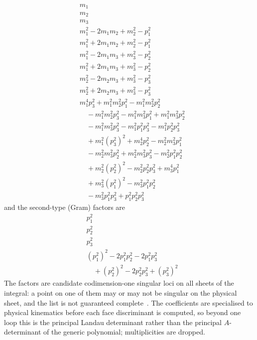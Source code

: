 \documentclass[11pt,a4paper]{article}
\begin{document}
\begin{align*}
&m_{1} \\
&m_{2} \\
&m_{3} \\
&m_{1}^{2} - 2 m_{1} m_{2} + m_{2}^{2} - p^{2}_{1} \\
&m_{1}^{2} + 2 m_{1} m_{2} + m_{2}^{2} - p^{2}_{1} \\
&m_{1}^{2} - 2 m_{1} m_{3} + m_{3}^{2} - p^{2}_{2} \\
&m_{1}^{2} + 2 m_{1} m_{3} + m_{3}^{2} - p^{2}_{2} \\
&m_{2}^{2} - 2 m_{2} m_{3} + m_{3}^{2} - p^{2}_{3} \\
&m_{2}^{2} + 2 m_{2} m_{3} + m_{3}^{2} - p^{2}_{3} \\
&m_{1}^{4} p^{2}_{3} + m_{1}^{2} m_{2}^{2} p^{2}_{1} - m_{1}^{2} m_{2}^{2} p^{2}_{2} \\
&\quad {}- m_{1}^{2} m_{2}^{2} p^{2}_{3} - m_{1}^{2} m_{3}^{2} p^{2}_{1} + m_{1}^{2} m_{3}^{2} p^{2}_{2} \\
&\quad {}- m_{1}^{2} m_{3}^{2} p^{2}_{3} - m_{1}^{2} p^{2}_{1} p^{2}_{3} - m_{1}^{2} p^{2}_{2} p^{2}_{3} \\
&\quad {}+ m_{1}^{2} \left(p^{2}_{3}\right)^{2} + m_{2}^{4} p^{2}_{2} - m_{2}^{2} m_{3}^{2} p^{2}_{1} \\
&\quad {}- m_{2}^{2} m_{3}^{2} p^{2}_{2} + m_{2}^{2} m_{3}^{2} p^{2}_{3} - m_{2}^{2} p^{2}_{1} p^{2}_{2} \\
&\quad {}+ m_{2}^{2} \left(p^{2}_{2}\right)^{2} - m_{2}^{2} p^{2}_{2} p^{2}_{3} + m_{3}^{4} p^{2}_{1} \\
&\quad {}+ m_{3}^{2} \left(p^{2}_{1}\right)^{2} - m_{3}^{2} p^{2}_{1} p^{2}_{2} \\
&\quad {}- m_{3}^{2} p^{2}_{1} p^{2}_{3} + p^{2}_{1} p^{2}_{2} p^{2}_{3}
\end{align*}
and the second-type (Gram) factors are
\begin{align*}
&p^{2}_{1} \\
&p^{2}_{2} \\
&p^{2}_{3} \\
&\left(p^{2}_{1}\right)^{2} - 2 p^{2}_{1} p^{2}_{2} - 2 p^{2}_{1} p^{2}_{3} \\
&\quad {}+ \left(p^{2}_{2}\right)^{2} - 2 p^{2}_{2} p^{2}_{3} + \left(p^{2}_{3}\right)^{2}
\end{align*}
The factors are candidate codimension-one singular loci on all sheets of the integral: a point on one of them may or may not be singular on the physical sheet, and the list is not guaranteed complete~\cite{fmt2023}. The coefficients are specialised to physical kinematics before each face discriminant is computed, so beyond one loop this is the principal Landau determinant rather than the principal $A$-determinant of the generic polynomial; multiplicities are dropped.
\end{document}
